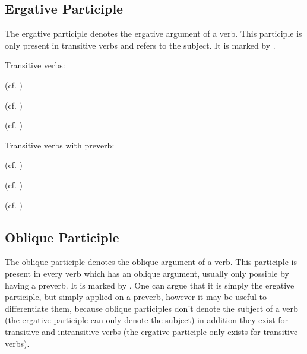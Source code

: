 \documentclass[a4paper, 10pt]{book}
\begin{document}
\subsection{Ergative Participle}
The ergative participle denotes the ergative argument of a verb. This participle is only present in transitive verbs and refers to the subject. It is marked by .

Transitive verbs:
\begin{exe}
\ex
\begin{xlist}
    \item {} (cf. )
    \item {} (cf. )
    \item {} (cf. )
\end{xlist}
\end{exe}

Transitive verbs with preverb:
\begin{exe}
    \ex
    \begin{xlist}
    \item {} (cf. )
    \item {} (cf. )
    \item {} (cf. )
\end{xlist}
\end{exe}

\subsection{Oblique Participle}
The oblique participle denotes the oblique argument of a verb. This participle is present in every verb which has an oblique argument, usually only possible by having a preverb. It is marked by . One can argue that it is simply the ergative participle, but simply applied on a preverb, however it may be useful to differentiate them, because oblique participles don't denote the subject of a verb (the ergative participle can only denote the subject) in addition they exist for transitive and intransitive verbs (the ergative participle only exists for transitive verbs). 
\end{document}

